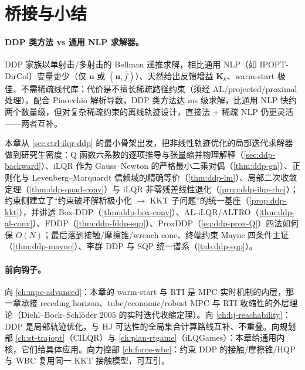 \section{桥接与小结}
\label{sec:ddp-summary}

\paragraph{DDP 类方法 vs 通用 NLP 求解器。}\;
DDP 家族以单射击/多射击的 Bellman 递推求解，相比通用 NLP（如 IPOPT-DirCol）变量更少（仅 $\mathbf{u}$ 或 $(\mathbf{u},\bar f)$）、天然给出反馈增益 $\mathbf{K}_k$、warm-start 极佳、不需稀疏线代库；代价是不擅长稀疏路径约束（须经 AL/projected/proximal 处理）。配合 Pinocchio 解析导数，DDP 类方法达 ms 级求解，比通用 NLP 快约两个数量级，但对复杂稀疏约束的离线轨迹设计，直接法 + 稀疏 NLP 仍更灵活——两者互补。

本章从 \cref{sec:ctrl-ilqr-ddp} 的最小骨架出发，把非线性轨迹优化的局部迭代求解器做到研究生密度：Q 函数六系数的逐项推导与张量缩并物理解释（\cref{sec:ddp-backward}）、iLQR 作为 Gauss--Newton 的严格最小二乘对偶（\cref{thm:ddp-gn}）、正则化与 Levenberg--Marquardt 信赖域的精确等价（\cref{thm:ddp-lm}）、局部二次收敛定理（\cref{thm:ddp-quad-conv}）与 iLQR 非零残差线性退化（\cref{prop:ddp-ilqr-rho}）；约束侧建立了“约束破坏解析极小化 $\to$ KKT 子问题”的统一基座（\cref{prop:ddp-kkt}），并讲透 Box-DDP（\cref{thm:ddp-box-conv}）、AL-iLQR/ALTRO（\cref{thm:ddp-al-conv}）、FDDP（\cref{thm:ddp-fddp-sqp}）、ProxDDP（\cref{eq:ddp-prox-Q}）四法如何保 $O(N)$；最后落到接触/摩擦锥/wrench cone、终端约束 Mayne 四条件主证（\cref{thm:ddp-mayne}）、李群 DDP 与 SQP 统一谱系（\cref{tab:ddp-sqp}）。

\paragraph{前向钩子。}\;
向 \cref{ch:mpc-advanced}：本章的 warm-start 与 RTI 是 MPC 实时机制的内层，那一章承接 receding horizon、tube/economic/robust MPC 与 RTI 收缩性的外层理论（Diehl--Bock--Schlöder $2005$ 的实时迭代收缩定理\cite{diehl2005realtime}）。向 \cref{ch:hj-reachability}：DDP 是局部轨迹优化，与 HJ 可达性的全局集合计算路线互补、不重叠。向规划部 \cref{ch:st-trajopt}（CILQR）与 \cref{ch:plan-rtgame}（iLQGames）：本章给通用内核，它们给具体应用。向力控部 \cref{ch:force-wbc}：约束 DDP 的接触/摩擦锥/HQP 与 WBC 复用同一 KKT 接触模型，可互引。

